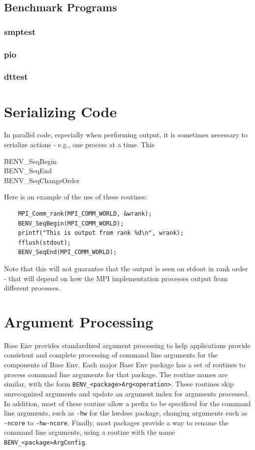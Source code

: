 \documentclass[11pt,letterpaper]{report}
\begin{document}
\section{Benchmark Programs}

\subsection{smptest}

\subsection{pio}

\subsection{dttest}

\chapter{Serializing Code}
In parallel code, especially when performing output, it is
sometimes necessary to serialize actions - e.g., one process at a
time.
This 

\begin{description}
\item[BENV\_SeqBegin]
\item[BENV\_SeqEnd]
\item[BENV\_SeqChangeOrder]
\end{description}

Here is an example of the use of these routines:
\begin{verbatim}
    MPI_Comm_rank(MPI_COMM_WORLD, &wrank);
    BENV_SeqBegin(MPI_COMM_WORLD);
    printf("This is output from rank %d\n", wrank);
    fflush(stdout);
    BENV_SeqEnd(MPI_COMM_WORLD);
\end{verbatim}
Note that this will not guarantee that the output is seen on stdout in
rank order - that will depend on how the MPI implementation processes
output from different processes.

\chapter{Argument Processing}
Base Env provides standardized argument processing to help applications provide
consistent and complete processing of command line arguments for the components
of Base Env.
Each major Base Env package has a set of routines to process command line
arguments for that package. The routine names are similar, with the
form \texttt{BENV\_<package>Arg<operation>}.
These routines skip unrecognized arguments and update an argument
index for arguments processed.
In addition, most of these routine allow a prefix to be specificed for
the command line arguments, such as \texttt{-hw} for the hwdesc
package, changing arguments such as \texttt{-ncore} to
\texttt{-hw-ncore}.
Finally, most packages provide a way to rename the command line
arguments, using a routine with the name \texttt{BENV\_<package>ArgConfig}.
\end{document}
